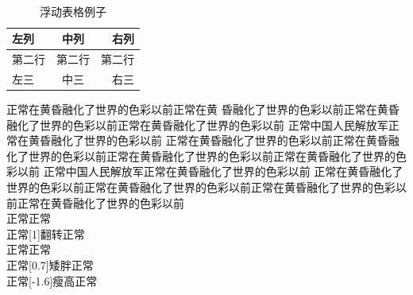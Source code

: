 \documentclass[UTF8,a5paper,12pt,portrait,openary,final]{ctexbook}
\begin{document}
\\
\begin{table}[htbp!]
\centering
\begin{tabular}{|l|c|r|}
\hline
左列&中列&右列\\
\hline
第二行&第二行&第二行\\
\hline
左三&中三&右三\\
\hline
\end{tabular}
\caption{浮动表格例子}
\label{tab:float}
\end{table}





正常在黄昏融化了世界的色彩以前正常在黄
昏融化了世界的色彩以前正常在黄昏融化了世界的色彩以前正常在黄昏融化了世界的色彩以前
正常中国人民解放军正常在黄昏融化了世界的色彩以前
正常在黄昏融化了世界的色彩以前正常在黄昏融化了世界的色彩以前正常在黄昏融化了世界的色彩以前正常在黄昏融化了世界的色彩以前
正常中国人民解放军正常在黄昏融化了世界的色彩以前
正常在黄昏融化了世界的色彩以前正常在黄昏融化了世界的色彩以前正常在黄昏融化了世界的色彩以前正常在黄昏融化了世界的色彩以前
\\
正常正常
\\
正常\scalebox{-1}[1]{翻转}正常
\\
正常正常
\\

正常\scalebox{-1.6}[0.7]{矮胖}正常
\\
正常\scalebox{0.7}[-1.6]{瘦高}正常
\\
\end{document}
